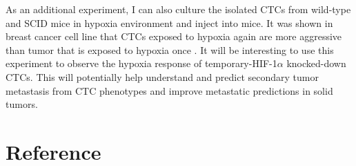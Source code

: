 \documentclass[11pts]{article}
\begin{document}
\noindent As an additional experiment, I can also culture the isolated CTCs from wild-type and SCID mice in hypoxia environment and inject into mice. It was shown in breast cancer cell line that CTCs exposed to hypoxia again are more aggressive than tumor that is exposed to hypoxia once \cite{Ameri:2010qf}. It will be interesting to use this experiment to observe the hypoxia response of temporary-HIF-1$\alpha$ knocked-down CTCs. This will potentially help understand and predict secondary tumor metastasis from CTC phenotypes and improve metastatic predictions in solid tumors. 
 \newline



\section{Reference}
\renewcommand{\section}[2]{}
{%

\setlength{\bibsep}{2.0pt}
}
\newpage
\end{document}
